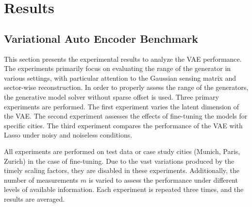
\chapter{Results}\label{chapter:results}
\section{Variational Auto Encoder Benchmark}\label{section:vae_benchmark}
This section presents the experimental results to analyze the \gls{VAE} performance.
The experiments primarily focus on evaluating the range of the generator in various settings, with particular attention to the Gaussian sensing matrix and sector-wise reconstruction.
In order to properly assess the range of the generators, the generative model solver without sparse offset is used.
Three primary experiments are performed.
The first experiment varies the latent dimension of the \gls{VAE}.
The second experiment assesses the effects of fine-tuning the models for specific cities.
The third experiment compares the performance of the \gls{VAE} with \gls{Lasso} under noisy and noiseless conditions.

All experiments are performed on test data or case study cities (Munich, Paris, Zurich) in the case of fine-tuning.
Due to the vast variations produced by the timely scaling factors, they are disabled in these experiments.
Additionally, the number of measurements $m$ is varied to assess the performance under different levels of available information.
Each experiment is repeated three times, and the results are averaged.

